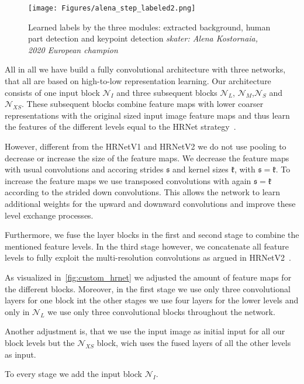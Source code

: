 \begin{figure}
    \centering
    \texttt{[image: Figures/alena\_step\_labeled2.png]}
    \decoRule
    \caption[Alena step]{Learned labels by the three modules: extracted background, human part detection and
    keypoint detection \textit{skater: Alena Kostornaia, 2020 European champion\cite{2020european}}}
    \label{fig:alena_step_labeled}
\end{figure}


All in all we have build a fully convolutional architecture with three networks, that all are based on high-to-low
representation learning. Our architecture consists of one input block $\mathcal{N}_I$  and three subsequent blocks
$\mathcal{N}_L$, $\mathcal{N}_M$,$\mathcal{N}_S$ and $\mathcal{N}_{XS}$.
These subsequent blocks combine feature maps with lower coarser representations with the original sized input image
feature maps and thus learn the features of the different levels equal to the HRNet strategy~\cite{HRNetv2, HRNetv1}.

However, different from the HRNetV1 and HRNetV2 we do not use pooling to decrease or increase the size of the feature
maps. We decrease the feature maps with usual convolutions and accoring strides $\mathfrak{s}$ and kernel sizes
$\mathfrak{k}$, with $\mathfrak{s}=\mathfrak{k}$.
To increase the feature maps we use transposed convolutions with again $\mathfrak{s}=\mathfrak{k}$ according to the
strided down convolutions.
This allows the network to learn additional weights for the upward and downward convolutions and improve these level
exchange processes.

Furthermore, we fuse the layer blocks in the first and second stage to combine the mentioned feature levels.
In the third stage however, we concatenate all feature levels to fully exploit the multi-resolution convolutions
as argued in HRNetV2~\cite{HRNetv2}.

As visualized in~\ref{fig:custom_hrnet} we adjusted the amount of feature maps for the different blocks.
Moreover, in the first stage we use only three convolutional layers for one block int the other stages we use four layers
for the lower levels and only in $\mathcal{N}_L$ we use only three convolutional blocks throughout the network.

Another adjustment is, that we use the input image as initial input for all our block levels but the $\mathcal{N}_{XS}$
block, wich uses the fused layers of all the other levels as input.

To every stage we add the input block $\mathcal{N}_I$.


